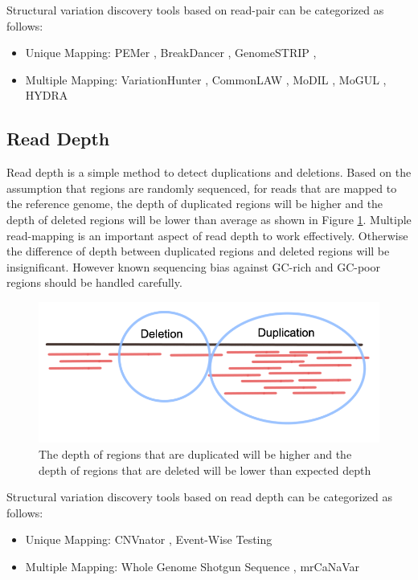 Structural variation discovery tools based on read-pair can be categorized as follows:
\begin{itemize}
    \item Unique Mapping: PEMer \cite{korbel2009pemer}, BreakDancer \cite{chen2009breakdancer}, GenomeSTRIP \cite{handsaker2015large}, 
    \item Multiple Mapping: VariationHunter \cite{hormozdiari2009combinatorial}, CommonLAW \cite{hormozdiari2011simultaneous}, MoDIL \cite{lee2009modil}, MoGUL \cite{lee2010mogul}, HYDRA \cite{quinlan2010genome}
\end{itemize}
\subsection{Read Depth}
Read depth is a simple method to detect duplications and deletions. Based on the assumption that regions are randomly sequenced, for reads that are mapped to the reference genome, the depth of duplicated regions will be higher and the depth of deleted regions will be lower than average \cite{bailey2002recent} as shown in Figure \ref{readdepth}. Multiple read-mapping is an important aspect of read depth to work effectively. Otherwise the difference of depth between duplicated regions and deleted regions will be insignificant. However known sequencing bias against GC-rich and GC-poor regions \cite{smith2008rapid} should be handled carefully.

\begin{figure}[ht]
    \centering
    \includegraphics[scale=0.7]{images/readdepth.png}
    \caption{The depth of regions that are duplicated will be higher and the depth of regions that are deleted will be lower than expected depth}
    \label{readdepth}
\end{figure}

Structural variation discovery tools based on read depth can be categorized as follows:
\begin{itemize}
    \item Unique Mapping: CNVnator \cite{abyzov2011cnvnator}, Event-Wise Testing \cite{yoon2009sensitive}
    \item Multiple Mapping: Whole Genome Shotgun Sequence \cite{bailey2002recent}, mrCaNaVar \cite{alkan2009personalized}
\end{itemize}


